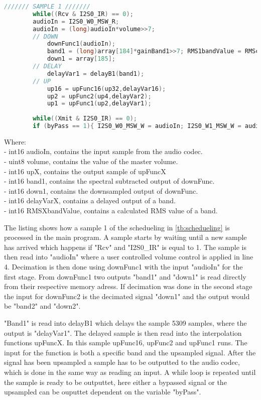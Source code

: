 \begin{lstlisting}[language=C, caption = {Sample 1},label={listingSample}]
/////// SAMPLE 1 ///////
    	while((Rcv & I2S0_IR) == 0); 							
	    audioIn = I2S0_W0_MSW_R;  
	    audioIn = (long)audioIn*volume>>7;	
	    // DOWN
		    downFunc1(audioIn); 			
			band1 = (long)array[184]*gainBand1>>7; RMS1bandValue = RMScalculate(RMS1bandBuffer,band1,&RMS1bandPtr, &RMS1bandSum);				
			down1 = array[185];							
		// DELAY			
			delayVar1 = delayB1(band1);
		// UP
			up16 = upFunc16(up32,delayVar16);
			up2 = upFunc2(up4,delayVar2);
			up1 = upFunc1(up2,delayVar1);
		
	    while((Xmit & I2S0_IR) == 0);  					
		if (byPass == 1){ I2S0_W0_MSW_W = audioIn; I2S0_W1_MSW_W = audioIn;} else { I2S0_W0_MSW_W = up1; I2S0_W1_MSW_W = up1;} 
\end{lstlisting}
Where: \\
- int16 audioIn, contains the input sample from the audio codec. \\
- uint8 volume, contains the value of the master volume. \\
- int16 upX, contains the output sample of upFuncX \\
- int16 band1, contains the spectral subtracted output of downFunc. \\
- int16 down1, contains the downsampled output of downFunc. \\
- int16 delayVarX, contains a delayed output of a band. \\
- int16 RMSXbandValue, contains a calculated RMS value of a band.

\newpage
The listing shows how a sample 1 of the schedueling in \autoref{tb:schedueling} is processed in the main program. A sample starts by waiting until a new sample has arrived which happens if "Rcv" and "I2S0\_IR" is equal to 1. The sample is then read into "audioIn" where a user controlled volume control is applied in line 4. Decimation is then done using downFunc1 with the input "audioIn" for the first stage. From downFunc1 two outputs "band1" and "down1" is read directly from their respective memory adress. If decimation was done in the second stage the input for downFunc2 is the decimated signal "down1" and the output would be "band2" and "down2".

"Band1" is read into delayB1 which delays the sample 5309 samples, where the output is "delayVar1". The delayed sample is then read into the interpolation functions upFuncX. In this sample upFunc16, upFunc2 and upFunc1 runs. The input for the function is both a specific band and the upsampled signal. After the signal has been upsampled a sample has to be outputted to the audio codec, which is done in the same way as reading an input. A while loop is repeated until the sample is ready to be outputtet, here either a bypassed signal or the upsampled can be ouputtet dependent on the variable "byPass". %



